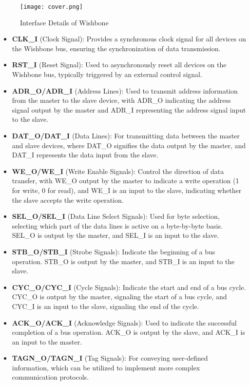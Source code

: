 \documentclass[conference]{IEEEtran}
\begin{document}
\begin{figure}[h]
    \centering
    \texttt{[image: cover.png]}
    \caption{Interface Details of Wishbone}
    \label{interface}
\end{figure}

\begin{itemize}
    \item \textbf{CLK\_I} (Clock Signal): Provides a synchronous clock signal for all devices on the Wishbone bus, ensuring the synchronization of data transmission.
    
    \item \textbf{RST\_I} (Reset Signal): Used to asynchronously reset all devices on the Wishbone bus, typically triggered by an external control signal.
    
    \item \textbf{ADR\_O/ADR\_I} (Address Lines): Used to transmit address information from the master to the slave device, with ADR\_O indicating the address signal output by the master and ADR\_I representing the address signal input to the slave.
    
    \item \textbf{DAT\_O/DAT\_I} (Data Lines): For transmitting data between the master and slave devices, where DAT\_O signifies the data output by the master, and DAT\_I represents the data input from the slave.
    
    \item \textbf{WE\_O/WE\_I} (Write Enable Signals): Control the direction of data transfer, with WE\_O output by the master to indicate a write operation (1 for write, 0 for read), and WE\_I is an input to the slave, indicating whether the slave accepts the write operation.
    
    \item \textbf{SEL\_O/SEL\_I} (Data Line Select Signals): Used for byte selection, selecting which part of the data lines is active on a byte-by-byte basis. SEL\_O is output by the master, and SEL\_I is an input to the slave.
    
    \item \textbf{STB\_O/STB\_I} (Strobe Signals): Indicate the beginning of a bus operation. STB\_O is output by the master, and STB\_I is an input to the slave.
    
    \item \textbf{CYC\_O/CYC\_I} (Cycle Signals): Indicate the start and end of a bus cycle. CYC\_O is output by the master, signaling the start of a bus cycle, and CYC\_I is an input to the slave, signaling the end of the cycle.
    
    \item \textbf{ACK\_O/ACK\_I} (Acknowledge Signals): Used to indicate the successful completion of a bus operation. ACK\_O is output by the slave, and ACK\_I is an input to the master.
    
    \item \textbf{TAGN\_O/TAGN\_I} (Tag Signals): For conveying user-defined information, which can be utilized to implement more complex communication protocols.
\end{itemize}
\end{document}
